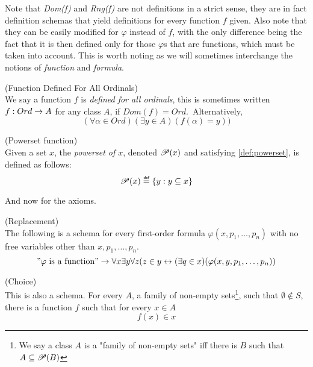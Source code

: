 Note that \emph{Dom(f)} and \emph{Rng(f)} are not definitions in a strict sense, they are in fact definition schemas that yield definitions for every function $f$ given. Also note that they can be easily modified for $\varphi$ instead of $f$, with the only difference being the fact that it is then defined only for those $\varphi$s that are functions, which must be taken into account. This is worth noting as we will sometimes interchange the notions of \emph{function} and \emph{formula}.

\begin{definition}{(Function Defined For All Ordinals)}\label{def:function_dfao}\\
We say a function $f$ is \emph{defined for all ordinals}, this is sometimes written $f: Ord \rightarrow A$ for any class $A$, if $Dom(f) = Ord$.\
Alternatively,
\begin{equation}
(\forall \alpha \in Ord)(\exists y \in A)(f(\alpha) = y))
\end{equation}
\end{definition}

\begin{definition}{(Powerset function)}\\
Given a set $x$, the \emph{powerset of $x$}, denoted $\mathscr{P} (x)$ and satisfying \ref{def:powerset}, is defined as follows:
\begin{equation}
\power{x} \defeq \{y: y \subseteq x\}
\end{equation}
\end{definition}

And now for the axioms.

\begin{definition}{(Replacement)}\label{def:replacement}\\
The following is a schema for every first-order formula $\varphi(x, p_1, \ldots, p_n)$ with no free variables other than $x, p_1, \ldots, p_n$.
\begin{equation}
"\varphi\mbox{ is a function}"\rightarrow \forall x \exists y \forall z (z \in y \leftrightarrow (\exists q \in x)(\varphi(x, y, p_1, \ldots, p_n))
\end{equation}
\end{definition}

\begin{definition}{(Choice)}\label{def:choice}\\
This is also a schema. For every $A$, a family of non-empty sets\footnote{We say a class $A$ is a "family of non-empty sets" iff there is $B$ such that $A \subseteq \mathscr{P} (B)$}, such that $\emptyset \not\in S$, there is a function $f$ such that for every $x \in A$
\begin{equation}
f(x) \in x
\end{equation}
\end{definition}

